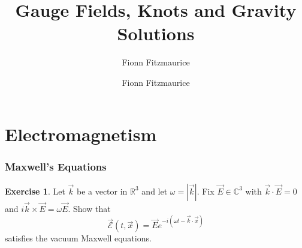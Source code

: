 \documentclass[11pt, a4paper]{article}
\title{Gauge Fields, Knots and Gravity Solutions}
\author{Fionn Fitzmaurice}
\date{}
\author{Fionn Fitzmaurice \hspace{20pt} \email{fionn@maths.tcd.ie}}
\theoremstyle{definition}
\newtheorem{ex}{Exercise}[part]
\begin{document}
\maketitle
\thispagestyle{empty}

\part{Electromagnetism}

\section{Maxwell's Equations}

\begin{ex}

Let $\vec{k}$ be a vector in $\mathbb{R}^3$ and let $\omega = |\vec{k}|$. Fix $\vec{E} \in \mathbb{C}^3$ with $\vec{k} \cdot \vec{E} = 0$ and $i \vec{k} \times \vec{E} = \omega \vec{E}$. Show that
\[
    \vec{\mathcal{E}}(t, \vec{x}) = \vec{E} e^{-i(\omega t - \vec{k} \cdot \vec{x})}
\]
satisfies the vacuum Maxwell equations.

\end{ex}
\end{document}
